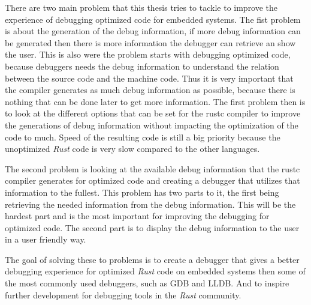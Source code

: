  


There are two main problem that this thesis tries to tackle to improve the experience of debugging optimized code for embedded systems.
The fist problem is about the generation of the debug information, if more debug information can be generated then there is more information the debugger can retrieve an show the user.
This is also were the problem starts with debugging optimized code, because debuggers needs the debug information to understand the relation between the source code and the machine code.
Thus it is very important that the compiler generates as much debug information as possible, because there is nothing that can be done later to get more information.
The first problem then is to look at the different options that can be set for the \gls{rustc} compiler to improve the generations of debug information without impacting the optimization of the code to much.
Speed of the resulting code is still a big priority because the unoptimized \emph{Rust} code is very slow compared to the other languages.


The second problem is looking at the available debug information that the \gls{rustc} compiler generates for optimized code and creating a debugger that utilizes that information to the fullest.
This problem has two parts to it, the first being retrieving the needed information from the debug information.
This will be the hardest part and is the most important for improving the debugging for optimized code.
The second part is to display the debug information to the user in a user friendly way.


The goal of solving these to problems is to create a debugger that gives a better debugging experience for optimized \emph{Rust} code on embedded systems then some of the most commonly used debuggers, such as \gls{GDB} and \gls{LLDB}.
And to inspire further development for debugging tools in the \emph{Rust} community.

